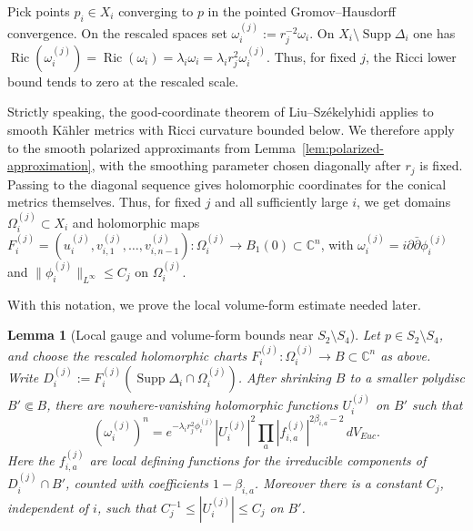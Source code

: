 \documentclass[11pt]{amsart}
\newtheorem{lemma}[theorem]{Lemma}
\theoremstyle{definition}
\theoremstyle{remark}
\begin{document}
Pick points $p_i\in X_i$ converging to $p$ in the pointed Gromov--Hausdorff
convergence. On the rescaled spaces set $\omega_i^{(j)}:=r_j^{-2}\omega_i$.
On $X_i\setminus\operatorname{Supp}\Delta_i$ one has
$\operatorname{Ric}(\omega_i^{(j)})=\operatorname{Ric}(\omega_i)
=\lambda_i\omega_i=\lambda_i r_j^2\omega_i^{(j)}$. Thus, for fixed $j$, the
Ricci lower bound tends to zero at the rescaled scale.

Strictly speaking, the good-coordinate theorem of Liu--Sz\'ekelyhidi applies to
smooth K\"ahler metrics with Ricci curvature bounded below. We therefore apply
\cite[Theorem~1.4 and Proposition~3.2]{SLI} to the smooth polarized
approximants from Lemma~\ref{lem:polarized-approximation}, with the smoothing
parameter chosen diagonally after $r_j$ is fixed. Passing to the diagonal
sequence gives holomorphic coordinates for the conical metrics themselves. Thus,
for fixed $j$ and all sufficiently large $i$, we get domains
$\Omega_i^{(j)}\subset X_i$ and holomorphic maps
$F_i^{(j)}=(u_i^{(j)},v_{i,1}^{(j)},\dots,v_{i,n-1}^{(j)}):
\Omega_i^{(j)}\to B_1(0)\subset\mathbb C^n$, with
$\omega_i^{(j)}=i\partial\bar\partial\phi_i^{(j)}$ and
$\|\phi_i^{(j)}\|_{L^\infty}\leq C_j$ on $\Omega_i^{(j)}$.

With this notation, we prove the local volume-form estimate needed later.

\begin{lemma}[Local gauge and volume-form bounds near $S_2\setminus S_4$]
\label{lem:tubular-trapping}
Let $p\in S_2\setminus S_4$, and choose the rescaled holomorphic charts
$F_i^{(j)}:\Omega_i^{(j)}\to B\subset\mathbb C^n$ as above. Write
$D_i^{(j)}:=F_i^{(j)}(\operatorname{Supp}\Delta_i\cap\Omega_i^{(j)})$.
After shrinking $B$ to a smaller polydisc $B'\Subset B$, there are
nowhere-vanishing holomorphic functions $U_i^{(j)}$ on $B'$ such that
\[
        (\omega_i^{(j)})^n
        =
        e^{-\lambda_i r_j^2\phi_i^{(j)}}|U_i^{(j)}|^2
        \prod_a |f_{i,a}^{(j)}|^{2\beta_{i,a}-2}\,dV_{Euc} .
\]
Here the $f_{i,a}^{(j)}$ are local defining functions for the irreducible
components of $D_i^{(j)}\cap B'$, counted with coefficients
$1-\beta_{i,a}$. Moreover there is a constant $C_j$, independent of $i$, such
that $C_j^{-1}\leq |U_i^{(j)}|\leq C_j$ on $B'$.
\end{lemma}
\end{document}
